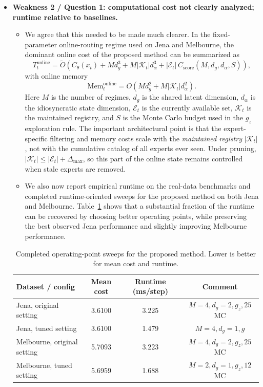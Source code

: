\begin{itemize}
    \item \textbf{Weakness 2 / Question 1: computational cost not clearly analyzed; runtime relative to baselines.}
    \begin{itemize}
        \item We agree that this needed to be made much clearer. In the fixed-parameter online-routing regime used on Jena and Melbourne, the dominant online cost of the proposed method can be summarized as
        \[
        T_t^{\mathrm{online}}
        =
        \widetilde O\!\left(
        C_\theta(x_t)
        + M d_g^3
        + M |\mathcal K_t| d_\alpha^3
        + |\mathcal E_t|\, C_{\mathrm{score}}(M,d_g,d_\alpha,S)
        \right),
        \]
        with online memory
        \[
        \mathrm{Mem}_t^{\mathrm{online}}
        =
        O\!\left(
        M d_g^2 + M |\mathcal K_t| d_\alpha^2
        \right).
        \]
        Here \(M\) is the number of regimes, \(d_g\) is the shared latent dimension, \(d_\alpha\) is the idiosyncratic state dimension, \(\mathcal E_t\) is the currently available set, \(\mathcal K_t\) is the maintained registry, and \(S\) is the Monte Carlo budget used in the \(g_z\) exploration rule. The important architectural point is that the expert-specific filtering and memory costs scale with the \emph{maintained registry} \(|\mathcal K_t|\), not with the cumulative catalog of all experts ever seen. Under pruning, \(|\mathcal K_t| \le |\mathcal E_t| + \Delta_{\max}\), so this part of the online state remains controlled when stale experts are removed.
        \item We also now report empirical runtime on the real-data benchmarks and completed runtime-oriented sweeps for the proposed method on both Jena and Melbourne. Table~\ref{tab:qba_runtime} shows that a substantial fraction of the runtime can be recovered by choosing better operating points, while preserving the best observed Jena performance and slightly improving Melbourne performance.
    \end{itemize}

    \begin{table}[h]
    \centering
    \caption{Completed operating-point sweeps for the proposed method. Lower is better for mean cost and runtime.}
    \label{tab:qba_runtime}
    \begin{tabular}{lccc}
    \toprule
    \textbf{Dataset / config} & \textbf{Mean cost} & \textbf{Runtime (ms/step)} & \textbf{Comment} \\
    \midrule
    Jena, original setting & 3.6100 & 3.225 & \(M=4, d_g=2, g_z, 25\) MC \\
    Jena, tuned setting & 3.6100 & 1.479 & \(M=4, d_g=1, g\) \\
    Melbourne, original setting & 5.7093 & 3.223 & \(M=4, d_g=2, g_z, 25\) MC \\
    Melbourne, tuned setting & 5.6959 & 1.688 & \(M=2, d_g=1, g_z, 12\) MC \\
    \bottomrule
    \end{tabular}
    \end{table}


\end{itemize}
